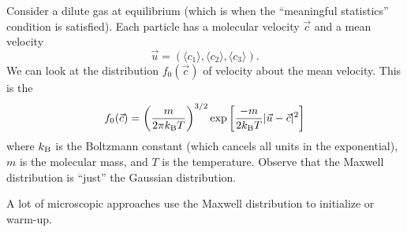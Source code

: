 \begin{node}
Consider a dilute gas at equilibrium (which is when the ``meaningful
statistics'' condition is satisfied). Each particle has a molecular
velocity $\vec{c}$ and a mean velocity
\begin{equation}
\vec{u}=(\langle c_{1}\rangle, \langle c_{2}\rangle, \langle c_{3}\rangle).
\end{equation}
We can look at the distribution $f_{0}(\vec{c})$ of velocity about the
mean velocity. This is the 
\begin{equation}
f_{0}(\vec{c})=\left(\frac{m}{2\pi k_{\textup{B}} T}\right)^{3/2}\exp\left[\frac{-m}{2k_{\textup{B}} T}|\vec{u}-\vec{c}|^{2}\right]
\end{equation}
where $k_{\textup{B}}$ is the Boltzmann constant (which cancels all units in
the exponential), $m$ is the molecular mass, and $T$ is the temperature.
Observe that the Maxwell distribution is ``just'' the Gaussian
distribution.

A lot of microscopic approaches use the Maxwell distribution to
initialize or warm-up.
\end{node}

